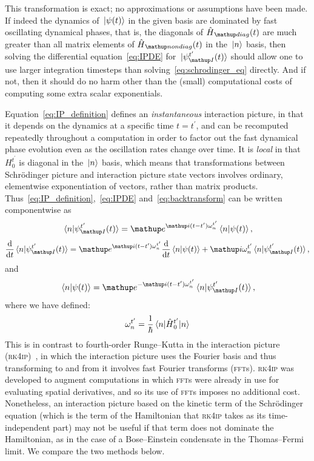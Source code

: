 This transformation is exact; no approximations or assumptions have been made. If indeed the dynamics of $\ket{\psi(t)}$ in the given basis are dominated by fast oscillating dynamical phases, that is, the diagonals of $\hat H_\up{diag}(t)$ are much greater than all matrix elements of $\hat H_\up{nondiag}(t)$ in the $\ket{n}$ basis, then solving the differential equation~\eqref{eq:IPDE} for $\ket{\psi_\up{I}^{t^\prime}(t)}$ should allow one to use larger integration timesteps than solving~\eqref{eq:schrodinger_eq} directly. And if not, then it should do no harm other than the (small) computational costs of computing some extra scalar exponentials.

Equation~\eqref{eq:IP_definition} defines an \emph{instantaneous} interaction picture, in that it depends on the dynamics at a specific time $t=t^\prime$, and can be recomputed repeatedly throughout a computation in order to factor out the fast dynamical phase evolution even as the oscillation rates change over time. It is \emph{local} in that $H_0^{t^\prime}$ is diagonal in the $\ket{n}$ basis, which means that transformations between Schr\"odinger picture and interaction picture state vectors involves ordinary, elementwise exponentiation of vectors, rather than matrix products. Thus~\eqref{eq:IP_definition},~\eqref{eq:IPDE} and~\eqref{eq:backtransform} can be written componentwise as
\begin{align}\label{eq:IP_definition_components}
\braket{n}{\psi_\up{I}^{t^\prime}(t)} = \ee^{\ii (t - t^\prime)\omega_n^{t^\prime}}\braket{n}{\psi(t)},
\end{align}
\begin{align}\label{eq:IPDE_components}
\dv t \braket{n}{\psi_\up{I}^{t^\prime}(t)}
    = \ee^{\ii (t - t^\prime)\omega_n^{t^\prime}}\dv t \braket{n}{\psi(t)}
      + \ii\omega_n^{t^\prime}\braket{n}{\psi_\up{I}^{t^\prime}(t)},
\end{align}
and
\begin{align}\label{eq:backtransform_components}
\braket{n}{\psi(t)} = \ee^{-\ii(t - t^\prime)\omega_n^{t^\prime}}\braket{n}{\psi_\up{I}^{t^\prime}(t)},
\end{align}
where we have defined:
\begin{align}\label{eq:omega}
\omega_n^{t^\prime} = \frac 1\hbar \matrixel{n}{\hat H_0^{t^\prime}}{n}
\end{align}
This is in contrast to fourth-order Runge--Kutta in the interaction picture (\textsc{rk4ip})~\cite{caradoc_davies_thesis}, in which the interaction picture uses the Fourier basis and thus transforming to and from it involves fast Fourier transforms (\textsc{fft}s). \textsc{rk4ip} was developed to augment computations in which \textsc{fft}s were already in use for evaluating spatial derivatives, and so its use of \textsc{fft}s imposes no additional cost. Nonetheless, an interaction picture based on the kinetic term of the Schr\"odinger equation (which is the term of the Hamiltonian that \textsc{rk4ip} takes as its time-independent part) may not be useful if that term does not dominate the Hamiltonian, as in the case of a Bose--Einstein condensate in the Thomas--Fermi limit. We compare the two methods below.

